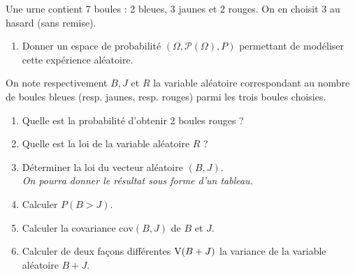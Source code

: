 \documentclass[a4paper,12pt,reqno]{amsart}
\begin{document}
\begin{exo}
  Une urne contient 7 boules : 2 bleues, 3 jaunes et 2 rouges. On en choisit 3 au hasard (sans remise).
  \begin{enumerate}
    \item  Donner un espace de probabilité $(\Omega, \mathcal P(\Omega), P)$ permettant de modéliser cette expérience aléatoire.
  \end{enumerate}
  On note respectivement $B, J$ et $R$ la variable aléatoire correspondant au nombre de boules bleues (resp. jaunes, resp. rouges) parmi les trois boules choisies.
  \begin{enumerate}[resume]
    \item Quelle est la probabilité d'obtenir 2 boules rouges ?
    \item Quelle est la loi de la variable aléatoire $R$ ?
    \item Déterminer la loi du vecteur aléatoire $(B,J)$.\\
      \textit{On pourra donner le résultat sous forme d'un tableau.}
    \item Calculer $P(B>J).$
    \item Calculer la covariance $\textrm{cov}(B,J)$ de $B$ et $J$.
    \item Calculer de deux façons différentes $\textrm V(B+J)$ la variance de la variable aléatoire $B+J$.
  \end{enumerate}
\end{exo}
\bigskip
\end{document}
